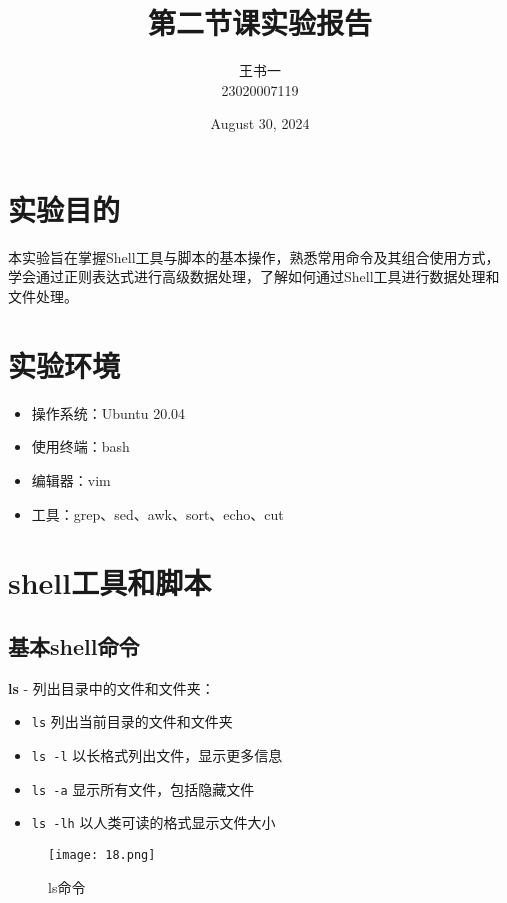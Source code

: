 \documentclass[a4paper, 12pt]{article}
\begin{document}
  \title{第二节课实验报告}
  \author{王书一 \\ 23020007119}
  \date{August 30, 2024}
  \maketitle

 \tableofcontents
 \newpage

  
  \section{实验目的}
   本实验旨在掌握Shell工具与脚本的基本操作，熟悉常用命令及其组合使用方式，学会通过正则表达式进行高级数据处理，了解如何通过Shell工具进行数据处理和文件处理。
  
\section{实验环境}
\begin{itemize}
    \item 操作系统：Ubuntu 20.04
    \item 使用终端：bash
    \item 编辑器：vim
    \item 工具：grep、sed、awk、sort、echo、cut
\end{itemize}

\section{shell工具和脚本}

\subsection{基本shell命令}

\textbf{ls} - 列出目录中的文件和文件夹：
\begin{itemize}
    \item \texttt{ls}           列出当前目录的文件和文件夹
    \item \texttt{ls -l}        以长格式列出文件，显示更多信息
    \item \texttt{ls -a}        显示所有文件，包括隐藏文件
    \item \texttt{ls -lh}      以人类可读的格式显示文件大小
\end{itemize}

\begin{figure}[H]
  \centering
    \texttt{[image: 18.png]}
  \caption{ls命令}
   \end{figure}
   
\end{document}
